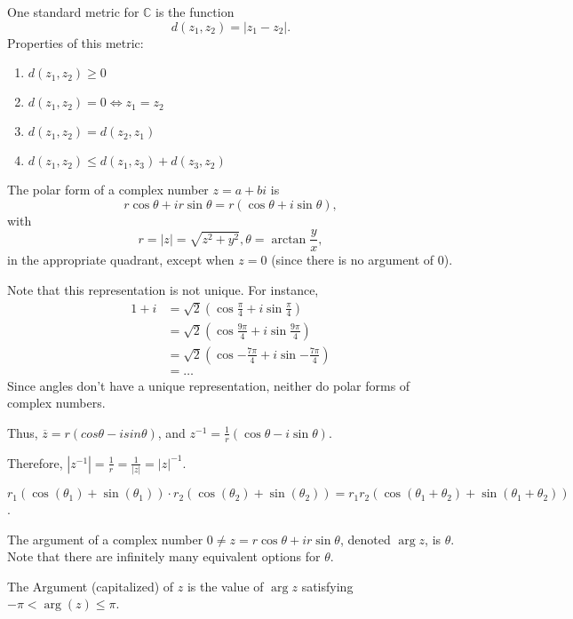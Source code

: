 \documentclass{article}
\newcommand{\inv}{^{-1}}
\newcommand{\C}{\mathbb C}
\begin{document}
\medskip
{}

    One standard metric for $\C$ is the function $$d(z_1, z_2) = |z_1 - z_2|.$$
    Properties of this metric:

    \begin{enumerate}
        \item $d(z_1, z_2) \geq 0$
        \item $d(z_1, z_2) = 0 \iff z_1 = z_2$
        \item $d(z_1, z_2) = d(z_2, z_1)$
        \item $d(z_1, z_2) \leq d(z_1, z_3) + d(z_3, z_2)$
    \end{enumerate}

\medskip
{}

    The polar form of a complex number $z = a+bi$ is $$r\cos\theta + ir\sin\theta = r(\cos\theta + i\sin\theta),$$ with $$r = |z| = \sqrt{z^2+y^2}, \theta = \arctan{\frac yx},$$ in the appropriate quadrant, except when $z=0$ (since there is no argument of $0$).

    Note that this representation is not unique. For instance,
    \begin{align*}
        1 + i &= \sqrt{2}(\cos{\frac{\pi}4} + i\sin{\frac{\pi}4}) \\
              &= \sqrt{2}(\cos{\frac{9\pi}4} + i\sin{\frac{9\pi}4}) \\
              &= \sqrt{2}(\cos{-\frac{7\pi}4} + i\sin{-\frac{7\pi}4}) \\
              &= \hdots
    \end{align*} Since angles don't have a unique representation, neither do polar forms of complex numbers.

    Thus, $\overline z = r(cos\theta - isin\theta)$, and $ z\inv = \frac1r(\cos\theta-i\sin\theta).$

    Therefore, $|z\inv| = \frac1r = \frac1{|z|} = |z|\inv$.

    $r_1(\cos(\theta_1) + \sin(\theta_1)) \cdot r_2(\cos(\theta_2) + \sin(\theta_2)) = r_1r_2(\cos(\theta_1 + \theta_2) + \sin(\theta_1 + \theta_2))$.

\medskip
{}

    The argument of a complex number $0 \neq z = r\cos\theta + ir\sin\theta$, denoted $\arg z$, is $\theta$. Note that there are infinitely many equivalent options for $\theta$.

    The Argument (capitalized) of $z$ is the value of $\arg z$ satisfying $-\pi < \arg(z) \leq \pi$.
\end{document}

